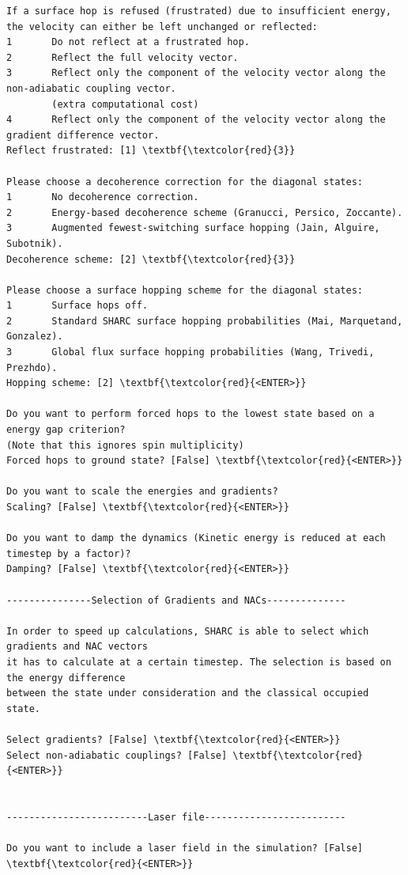 \documentclass[a4paper,11pt,DIV=15,openany]{scrbook}
\begin{document}
\begin{oframed}
\begin{Verbatim}[commandchars=\\\{\}]
If a surface hop is refused (frustrated) due to insufficient energy, 
the velocity can either be left unchanged or reflected:
1       Do not reflect at a frustrated hop.
2       Reflect the full velocity vector.
3       Reflect only the component of the velocity vector along the non-adiabatic coupling vector.
        (extra computational cost)
4       Reflect only the component of the velocity vector along the gradient difference vector.
Reflect frustrated: [1] \textbf{\textcolor{red}{3}}

Please choose a decoherence correction for the diagonal states:
1       No decoherence correction.
2       Energy-based decoherence scheme (Granucci, Persico, Zoccante).
3       Augmented fewest-switching surface hopping (Jain, Alguire, Subotnik).
Decoherence scheme: [2] \textbf{\textcolor{red}{3}}

Please choose a surface hopping scheme for the diagonal states:
1       Surface hops off.
2       Standard SHARC surface hopping probabilities (Mai, Marquetand, Gonzalez).
3       Global flux surface hopping probabilities (Wang, Trivedi, Prezhdo).
Hopping scheme: [2] \textbf{\textcolor{red}{<ENTER>}}

Do you want to perform forced hops to the lowest state based on a energy gap criterion?
(Note that this ignores spin multiplicity)
Forced hops to ground state? [False] \textbf{\textcolor{red}{<ENTER>}}

Do you want to scale the energies and gradients?
Scaling? [False] \textbf{\textcolor{red}{<ENTER>}}

Do you want to damp the dynamics (Kinetic energy is reduced at each timestep by a factor)?
Damping? [False] \textbf{\textcolor{red}{<ENTER>}}

---------------Selection of Gradients and NACs--------------

In order to speed up calculations, SHARC is able to select which gradients and NAC vectors 
it has to calculate at a certain timestep. The selection is based on the energy difference 
between the state under consideration and the classical occupied state.

Select gradients? [False] \textbf{\textcolor{red}{<ENTER>}}
Select non-adiabatic couplings? [False] \textbf{\textcolor{red}{<ENTER>}}


-------------------------Laser file-------------------------

Do you want to include a laser field in the simulation? [False] \textbf{\textcolor{red}{<ENTER>}}


\end{Verbatim}
\end{oframed}
\end{document}
